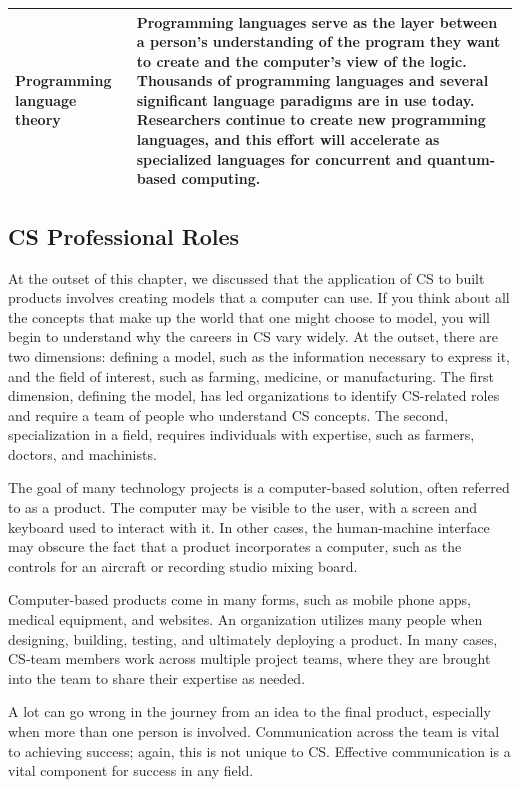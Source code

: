 \begin{longtable}[H]{p{.8in}|p{3.6in}}
	\hline
	\Tstrut Programming language theory & Programming languages serve as the layer between a person's understanding of the program they want to create and the computer's view of the logic. Thousands of programming languages and several significant language paradigms are in use today. Researchers continue to create new programming languages, and this effort will accelerate as specialized languages for concurrent and quantum-based computing.\\
	\bottomrule
\end{longtable}


\subsection{CS Professional Roles}

At the outset of this chapter, we discussed that the application of CS to built products involves creating models that a computer can use. If you think about all the concepts that make up the world that one might choose to model, you will begin to understand why the careers in CS vary widely. At the outset, there are two dimensions: defining a model, such as the information necessary to express it, and the field of interest, such as farming, medicine, or manufacturing. The first dimension, defining the model, has led organizations to identify CS-related roles and require a team of people who understand CS concepts. The second, specialization in a field, requires individuals with expertise, such as farmers, doctors, and machinists.

The goal of many technology projects is a computer-based solution, often referred to as a product. The computer may be visible to the user, with a screen and keyboard used to interact with it. In other cases, the human-machine interface may obscure the fact that a product incorporates a computer, such as the controls for an aircraft or recording studio mixing board.

Computer-based products come in many forms, such as mobile phone apps, medical equipment, and websites. An organization utilizes many people when designing, building, testing, and ultimately deploying a product. In many cases, CS-team members work across multiple project teams, where they are brought into the team to share their expertise as needed. 

A lot can go wrong in the journey from an idea to the final product, especially when more than one person is involved. Communication across the team is vital to achieving success; again, this is not unique to CS. Effective communication is a vital component for success in any field.

